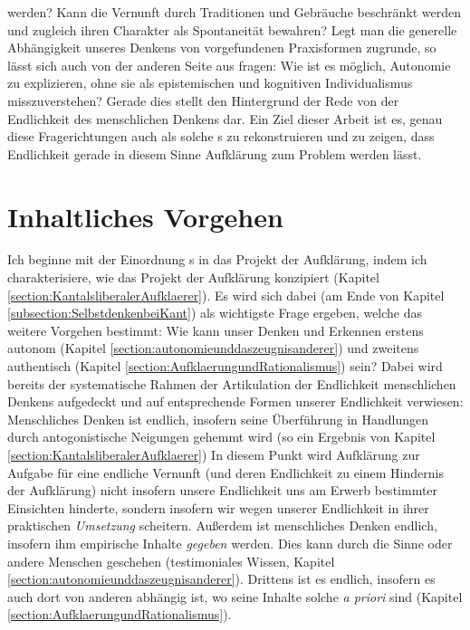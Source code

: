 werden? Kann die Vernunft durch Traditionen und Gebräuche beschränkt werden und
zugleich ihren Charakter als Spontaneität bewahren? Legt man die generelle
Abhängigkeit unseres Denkens von vorgefundenen Praxisformen zugrunde, so lässt
sich auch von der anderen Seite aus fragen: Wie ist es möglich, Autonomie zu
explizieren, ohne sie als epistemischen und kognitiven Individualismus
misszuverstehen? Gerade dies stellt den Hintergrund der Rede von der Endlichkeit
des menschlichen Denkens dar. Ein Ziel dieser Arbeit ist es, genau diese
Fragerichtungen auch als solche s zu rekonstruieren und zu
zeigen, dass Endlichkeit gerade in diesem Sinne Aufklärung zum Problem werden
lässt.


\section{Inhaltliches Vorgehen}
Ich beginne mit der Einordnung s in das Projekt der
Aufklärung, indem ich charakterisiere, wie  das Projekt der
Aufklärung konzipiert (Kapitel \ref{section:KantalsliberalerAufklaerer}). Es
wird sich dabei (am Ende von Kapitel \ref{subsection:SelbstdenkenbeiKant}) als
wichtigste Frage ergeben, welche das weitere Vorgehen bestimmt: Wie kann unser
Denken und Erkennen erstens autonom (Kapitel
\ref{section:autonomieunddaszeugnisanderer}) und zweitens authentisch (Kapitel
\ref{section:AufklaerungundRationalismus}) sein? Dabei wird bereits der
systematische Rahmen der Artikulation der Endlichkeit menschlichen Denkens
aufgedeckt und auf entsprechende Formen unserer Endlichkeit verwiesen:
Menschliches Denken ist endlich, insofern seine Überführung in Handlungen durch
antogonistische Neigungen gehemmt wird (so ein Ergebnis von Kapitel
\ref{section:KantalsliberalerAufklaerer}) In diesem Punkt wird Aufklärung zur
Aufgabe für eine endliche Vernunft (und deren Endlichkeit zu einem Hindernis der
Aufklärung) nicht insofern unsere Endlichkeit uns am Erwerb bestimmter
Einsichten hinderte, sondern insofern wir wegen unserer Endlichkeit in ihrer
praktischen \emph{Umsetzung} scheitern. Außerdem ist menschliches Denken
endlich, insofern ihm empirische Inhalte \emph{gegeben} werden. Dies kann durch
die Sinne oder andere Menschen geschehen (testimoniales Wissen, Kapitel
\ref{section:autonomieunddaszeugnisanderer}). Drittens ist es endlich, insofern
es auch dort von anderen abhängig ist, wo seine Inhalte solche \emph{a priori}
sind (Kapitel \ref{section:AufklaerungundRationalismus}).

